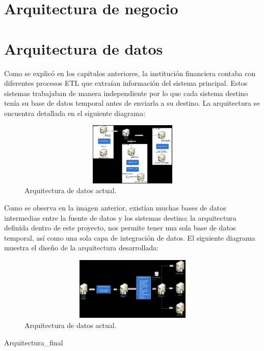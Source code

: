 \documentclass[a4paper,openright,12pt]{book}
\begin{document}
\section{Arquitectura de negocio}
\section{Arquitectura de datos}
Como se explicó en los capitulos anteriores, la institución financiera contaba con diferentes procesos ETL que extraían información del sistema principal. Estos sistemas trabajaban de manera independiente por lo que cada sistema destino tenía su base de datos temporal antes de enviarla a su destino. La arquitectura se encuentra detallada en el siguiente diagrama:

\begin{figure}[htb]
  \begin{center}
    \includegraphics[width=12cm, height=3cm, scale=0.5]{Arquitecturadatos_actual.jpg}
        \caption{Arquitectura de datos actual.}
    \label{fig:arquitecturaactual}
  \end{center}
\end{figure}

Como se observa en la imagen anterior, existían muchas bases de datos intermedias entre la fuente de datos y los sistemas destino; la arquitectura definida dentro de este proyecto, nos permite tener una sola base de datos temporal, así como una sola capa de integración de datos. El siguiente diagrama muestra el diseño de la arquitectura desarrollada: 

\begin{figure}[htb]
  \begin{center}
    \includegraphics[width=12cm, height=3cm, scale=0.5]{Arquitectura_final.jpg}
        \caption{Arquitectura de datos actual.}
    \label{fig:Arquitecturafinal}
  \end{center}
\end{figure}
Arquitectura\_final
\end{document}
